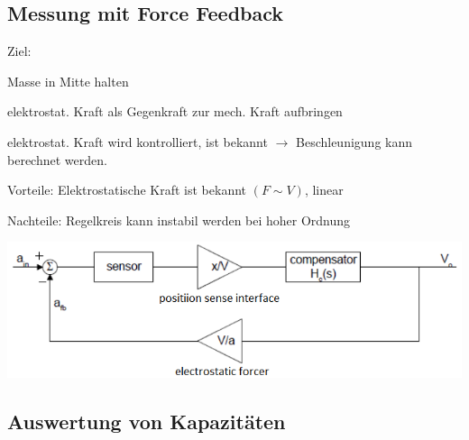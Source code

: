 \vspace{-0.5cm}
\subsection{Messung mit Force Feedback}
\begin{minipage}{0.4\textwidth}
  \begin{compactitem}
    \item Ziel: 
    \begin{compactitem}
        \item Masse in Mitte halten
        \item elektrostat. Kraft als Gegenkraft zur mech. Kraft  aufbringen
        \item elektrostat. Kraft wird kontrolliert, ist bekannt $\rightarrow$ Beschleunigung kann berechnet werden.
    \end{compactitem}
  \end{compactitem}
  \begin{compactitem}
    \item Vorteile:  Elektrostatische Kraft ist bekannt $(F\sim V)$, linear
  \end{compactitem}
  \begin{compactitem}
    \item Nachteile: Regelkreis kann instabil werden bei hoher Ordnung
  \end{compactitem}
\end{minipage}
\hfill
\begin{minipage}{0.5\textwidth}
    \vspace{0pt}
    \hspace{-0.7cm}
    \includegraphics[width=1.1\textwidth]{images/Force_Feedback}
\end{minipage}

\subsection{Auswertung von Kapazitäten}
